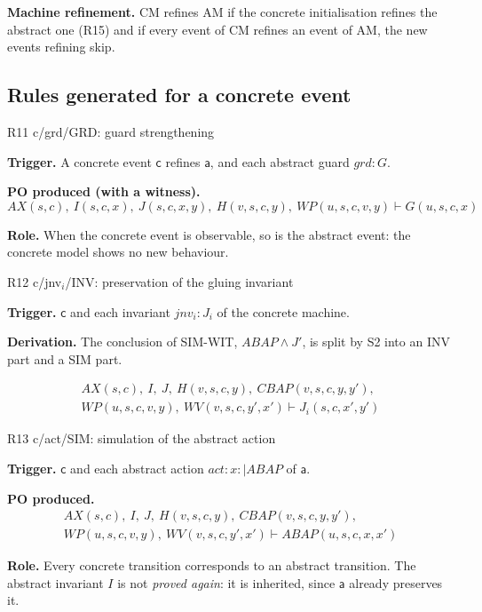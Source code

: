\documentclass[11pt,a4paper]{article}
\newcommand{\AX}{\mathit{AX}(s,c)}
\newcommand{\sff}[1]{\textsf{#1}}
\newcommand{\po}[1]{\textsf{\small #1}}
\newcommand{\champ}[1]{\par\smallskip\noindent\textbf{#1}\enspace}
\begin{document}
\textbf{Machine refinement.} \sff{CM} refines \sff{AM} if the concrete
initialisation refines the abstract one (R15) and if every event of \sff{CM}
refines an event of \sff{AM}, the new events refining \sff{skip}.

\subsection{Rules generated for a concrete event}

\begin{regle}{R11 \quad \po{c/grd/GRD}: guard strengthening}
  \champ{Trigger.} A concrete event $\mathsf{c}$ \sff{refines} $\mathsf{a}$, and each
  abstract guard $grd : G$.
  \champ{PO produced (with a witness).}
  \[ \AX,\ I(s,c,x),\ J(s,c,x,y),\ H(v,s,c,y),\ \mathit{WP}(u,s,c,v,y) \vdash G(u,s,c,x) \]
  \champ{Role.} When the concrete event is observable, so is the abstract event:
  the concrete model shows no new behaviour.
\end{regle}

\begin{regle}{R12 \quad \po{c/jnv$_i$/INV}: preservation of the gluing invariant}
  \champ{Trigger.} $\mathsf{c}$ and each invariant $jnv_i : J_i$ of the concrete
  machine.
  \champ{Derivation.} The conclusion of SIM-WIT, $\mathit{ABAP}\wedge J'$, is split
  by S2 into an INV part and a SIM part.
  
  \begin{multline*} \AX,\ I,\ J,\ H(v,s,c,y),\ \mathit{CBAP}(v,s,c,y,y'),\\ \mathit{WP}(u,s,c,v,y),\ \mathit{WV}(v,s,c,y',x') \vdash J_i(s,c,x',y') \end{multline*}
\end{regle}

\begin{regle}{R13 \quad \po{c/act/SIM}: simulation of the abstract action}
  \champ{Trigger.} $\mathsf{c}$ and each abstract action $act : x :\mid \mathit{ABAP}$
  of $\mathsf{a}$.
  \champ{PO produced.}
  \begin{multline*} \AX,\ I,\ J,\ H(v,s,c,y),\ \mathit{CBAP}(v,s,c,y,y'),\\ \mathit{WP}(u,s,c,v,y),\ \mathit{WV}(v,s,c,y',x') \vdash \mathit{ABAP}(u,s,c,x,x') \end{multline*}
  \champ{Role.} Every concrete transition corresponds to an abstract transition.
  The abstract invariant $I$ is not \emph{proved again}: it is inherited, since
  $\mathsf{a}$ already preserves it.
\end{regle}
\end{document}
